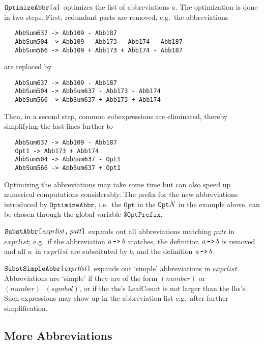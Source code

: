 \documentclass[twoside,11pt]{article}
\def\Var#1{\ensuremath{\mathit{#1}}}
\def\Va{\Var{a}}
\def\Vb{\Var{b}}
\def\Code#1{\ensuremath{\texttt{#1}}}
\def\ie{i.e.\ }
\def\eg{e.g.\ }
\begin{document}
\Code{OptimizeAbbr[\Va]} optimizes the list of abbreviations \Va.  The
optimization is done in two steps.  First, redundant parts are removed,
\eg the abbreviations
\begin{verbatim}
   AbbSum637 -> Abb109 - Abb187
   AbbSum504 -> Abb109 - Abb173 - Abb174 - Abb187
   AbbSum566 -> Abb109 + Abb173 + Abb174 - Abb187
\end{verbatim}
are replaced by
\begin{verbatim}
   AbbSum637 -> Abb109 - Abb187
   AbbSum504 -> AbbSum637 - Abb173 - Abb174
   AbbSum566 -> AbbSum637 + Abb173 + Abb174
\end{verbatim}
Then, in a second step, common subexpressions are eliminated, thereby
simplifying the last lines further to
\begin{verbatim}
   AbbSum637 -> Abb109 - Abb187
   Opt1 -> Abb173 + Abb174
   AbbSum504 -> AbbSum637 - Opt1
   AbbSum566 -> AbbSum637 + Opt1
\end{verbatim}
Optimizing the abbreviations may take some time but can also speed up
numerical computations considerably.  The prefix for the new 
abbreviations introduced by \Code{OptimizeAbbr}, \ie the \Code{Opt} in 
the \Code{Opt\Var{N}} in the example above, can be chosen through the 
global variable \Code{\$OptPrefix}.

\Code{SubstAbbr[\Var{exprlist},\,\Var{patt}]} expands out all 
abbreviations matching \Var{patt} in \Var{exprlist}; \eg if the 
abbreviation \Code{\Va\,->\,\Vb} matches, the definition 
\Code{\Va\,->\,\Vb} is removed and all \Va\ in \Var{exprlist} are 
substituted by \Vb, and the definition \Code{\Va\,->\,\Vb}.

\Code{SubstSimpleAbbr[\Var{exprlist}]} expands out `simple' 
abbreviations in \Var{exprlist}.  Abbreviations are `simple' if they are 
of the form \Var{(number)} or $\Var{(number)}\cdot\Var{(symbol)}$, or if 
the rhs's LeafCount is not larger than the lhs's.  Such expressions may 
show up in the abbreviation list \eg after further simplification.


\subsection{More Abbreviations}
\end{document}
